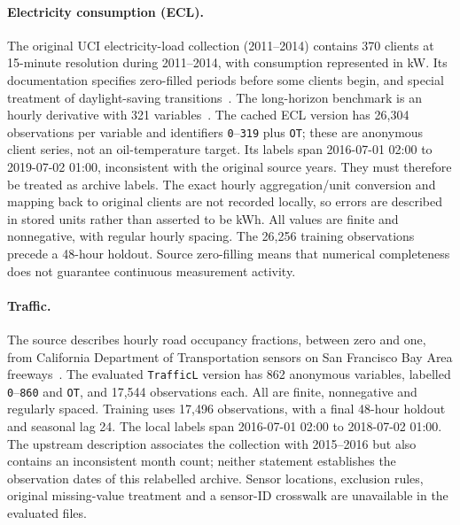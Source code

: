 \paragraph{Electricity consumption (ECL).}
The original UCI electricity-load collection (2011--2014) contains 370 clients at 15-minute resolution during 2011--2014, with consumption represented in kW. Its documentation specifies zero-filled periods before some clients begin, and special treatment of daylight-saving transitions~\cite{electricity_data}. The long-horizon benchmark is an hourly derivative with 321 variables~\cite{lai_data}. The cached ECL version has 26,304 observations per variable and identifiers \texttt{0}--\texttt{319} plus \texttt{OT}; these are anonymous client series, not an oil-temperature target. Its labels span 2016-07-01 02:00 to 2019-07-02 01:00, inconsistent with the original source years. They must therefore be treated as archive labels. The exact hourly aggregation/unit conversion and mapping back to original clients are not recorded locally, so errors are described in stored units rather than asserted to be kWh. All values are finite and nonnegative, with regular hourly spacing. The 26,256 training observations precede a 48-hour holdout. Source zero-filling means that numerical completeness does not guarantee continuous measurement activity.

\paragraph{Traffic.}
The source describes hourly road occupancy fractions, between zero and one, from California Department of Transportation sensors on San Francisco Bay Area freeways~\cite{lai_data}. The evaluated \texttt{TrafficL} version has 862 anonymous variables, labelled \texttt{0}--\texttt{860} and \texttt{OT}, and 17,544 observations each. All are finite, nonnegative and regularly spaced. Training uses 17,496 observations, with a final 48-hour holdout and seasonal lag 24. The local labels span 2016-07-01 02:00 to 2018-07-02 01:00. The upstream description associates the collection with 2015--2016 but also contains an inconsistent month count; neither statement establishes the observation dates of this relabelled archive. Sensor locations, exclusion rules, original missing-value treatment and a sensor-ID crosswalk are unavailable in the evaluated files.

